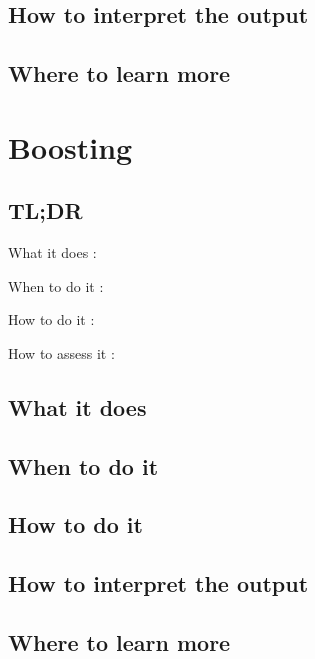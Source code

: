 \documentclass[
]{book}
\begin{document}
\hypertarget{how-to-interpret-the-output-17}{%
\section{How to interpret the output}\label{how-to-interpret-the-output-17}}

\hypertarget{where-to-learn-more-17}{%
\section{Where to learn more}\label{where-to-learn-more-17}}

\hypertarget{boosting}{%
\chapter{Boosting}\label{boosting}}

\hypertarget{tldr-18}{%
\section{TL;DR}\label{tldr-18}}

What it does
:

When to do it
:

How to do it
:

How to assess it
:

\hypertarget{what-it-does-18}{%
\section{What it does}\label{what-it-does-18}}

\hypertarget{when-to-do-it-18}{%
\section{When to do it}\label{when-to-do-it-18}}

\hypertarget{how-to-do-it-18}{%
\section{How to do it}\label{how-to-do-it-18}}

\hypertarget{how-to-interpret-the-output-18}{%
\section{How to interpret the output}\label{how-to-interpret-the-output-18}}

\hypertarget{where-to-learn-more-18}{%
\section{Where to learn more}\label{where-to-learn-more-18}}
\end{document}
